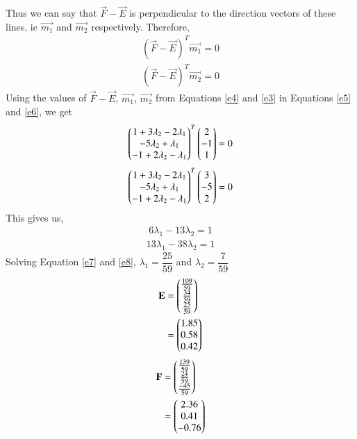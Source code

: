 \documentclass[journal,12pt,twocolumn]{IEEEtran}
\begin{document}
Thus we can say that $\vec{F}-\vec{E}$ is perpendicular to the direction vectors of these lines, ie $\vec{m_1}$ and $\vec{m_2}$ respectively. Therefore,
\begin{align}\label{e5}
    (\vec{F}-\vec{E})^T \vec{m_1} = 0
\end{align}
\begin{align}\label{e6}
    (\vec{F}-\vec{E})^T \vec{m_2} = 0
\end{align}
Using the values of $\vec{F}-\vec{E}$, $\vec{m_1}$, $\vec{m_2}$ from Equations \ref{e4} and \ref{e3} in Equations \ref{e5} and \ref{e6}, we get
\begin{align}
    \begin{pmatrix} 1 + 3\lambda_2 -2\lambda_1 \\ -5\lambda_2 + \lambda_1 \\ -1 + 2\lambda_2 - \lambda_1\end{pmatrix}^T\begin{pmatrix}2 \\ -1 \\ 1\end{pmatrix} = 0
\end{align}
\begin{align}
    \begin{pmatrix} 1 + 3\lambda_2 -2\lambda_1 \\ -5\lambda_2 + \lambda_1 \\ -1 + 2\lambda_2 - \lambda_1\end{pmatrix}^T\begin{pmatrix}3 \\ -5 \\ 2\end{pmatrix} = 0
\end{align}
This gives us,
\begin{align}\label{e7}
    6\lambda_1 -13\lambda_2 = 1
\end{align}
\begin{align}\label{e8}
   13\lambda_1 -38\lambda_2 = 1
\end{align}
Solving Equation \ref{e7} and \ref{e8}, $\lambda_1 = \dfrac{25}{59}$ and $\lambda_2 = \dfrac{7}{59}$\\
\begin{align}
    \mathbf{E} & = \begin{pmatrix}\frac{109}{59} \\ \frac{34}{59}
    \\ \frac{25}{59}\end{pmatrix}
    \\&=\begin{pmatrix}1.85 \\ 0.58 \\ 0.42\end{pmatrix}
\end{align}
\begin{align}
    \mathbf{F} & = \begin{pmatrix}\frac{139}{59} \\ \frac{24}{59}
    \\ \frac{-45}{59}\end{pmatrix}
    \\&=\begin{pmatrix}2.36 \\ 0.41 \\ -0.76\end{pmatrix}
\end{align}
\end{document}
